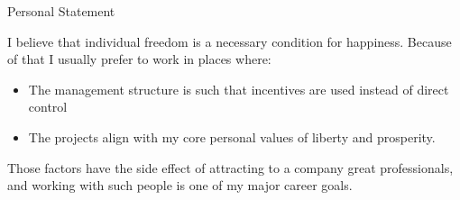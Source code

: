 \begin{rubric}{Personal Statement}{

\prefix{}

\entry*

    I believe that individual freedom is a necessary condition for
happiness. Because of that I usually prefer to work in places where:

\begin{itemize}
\item The management structure is such that incentives are used
instead of direct control
\item The projects align with my core personal values of liberty and
prosperity.
\end{itemize}

    Those factors have the side effect of attracting to a company
great professionals, and working with such people is one of my major
career goals.

}
\end{rubric}
